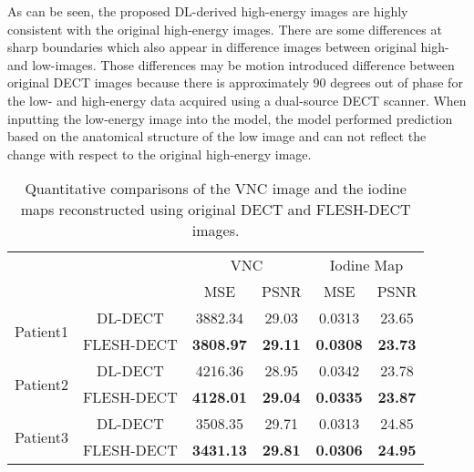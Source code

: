\documentclass[journal,twoside,web]{ieeecolor}
\begin{document}
As can be seen, the proposed DL-derived high-energy images are highly consistent with the original high-energy images. There are some differences at sharp boundaries which also appear in difference images between original high- and low-images. Those differences may be motion introduced difference between original DECT images because there is approximately 90 degrees out of phase for the low- and high-energy data acquired using a dual-source DECT scanner. When inputting the low-energy image into the model, the model performed prediction based on the anatomical structure of the low image and can not reflect the change with respect to the original high-energy image.

\begin{table}[b]%
    \begin{center}
        \caption{Quantitative comparisons of the VNC image and the iodine maps reconstructed using original DECT and FLESH-DECT images.}
        \begin{tabular}{ c c | c c | c c }
            \hline\hline
            \multicolumn{2}{c}{\multirow{2}{*}{}} & \multicolumn{2}{|c|}{VNC} & \multicolumn{2}{c}{Iodine Map} \\
            & & MSE & PSNR & MSE & PSNR \\
            \hline
            \multirow{2}{*}{Patient1} & DL-DECT & 3882.34 & 29.03 & 0.0313 & 23.65 \\
            & FLESH-DECT & \textbf{3808.97} & \textbf{29.11} & \textbf{0.0308} & \textbf{23.73} \\
            \hline
            \multirow{2}{*}{Patient2} & DL-DECT & 4216.36 & 28.95 & 0.0342 & 23.78 \\
            & FLESH-DECT & \textbf{4128.01} & \textbf{29.04} & \textbf{0.0335} & \textbf{23.87} \\
            \hline
            \multirow{2}{*}{Patient3} & DL-DECT & 3508.35 & 29.71 & 0.0313 & 24.85 \\
            & FLESH-DECT & \textbf{3431.13} & \textbf{29.81} & \textbf{0.0306} & \textbf{24.95} \\
            \hline\hline
        \end{tabular}
        \label{tab:2}
    \end{center}
\end{table}
\end{document}

